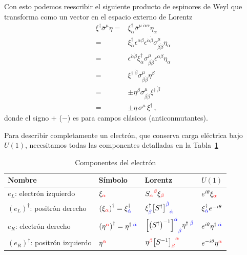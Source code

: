 Con esto podemos reescribir el siguiente producto de espinores  de Weyl que transforma como un vector en el espacio externo de Lorentz
\begin{align}
\label{eq:exxe}
  \xi^{\dagger}\overline{\sigma}^{\mu}\eta=& \xi^{\dagger}_{\dot{\alpha}}\overline{\sigma}^{\mu\;\dot{\alpha}\alpha}\eta_{\alpha}\nonumber\\
=&\xi^{\dagger}_{\dot{\alpha}}\epsilon^{\alpha\beta}\epsilon^{\dot{\alpha}\dot{\beta}}{\sigma}^{\mu}_{\beta\dot{\beta}} \eta_{\alpha}\nonumber\\
  =&\epsilon^{\dot{\alpha}\dot{\beta}}\xi^{\dagger}_{\dot{\alpha}}{\sigma}^{\mu}_{\beta\dot{\beta}} \epsilon^{\alpha\beta}\eta_{\alpha}\nonumber\\
  =&\xi^{\dagger\;\dot{\beta}}{\sigma}^{\mu}_{\beta\dot{\beta}} \eta^{\beta}\nonumber\\
  =&\pm\eta^{\beta}{\sigma}^{\mu}_{\beta\dot{\beta}}\xi^{\dagger\;\dot{\beta}} \nonumber\\
  =&\pm\eta\,{\sigma}^{\mu}\,\xi^{\dagger} \,,
\end{align}
donde el signo $+$ ($-$) es para campos clásicos (anticonmutantes).
\begin{frame}
Para describir completamente un electrón, que conserva carga eléctrica bajo $U(1)$, necesitamos todas las componentes detalladas en la Tabla~\ref{tab:electron}
\begin{table}
  \centering
  \begin{tabular}{llll}
    Nombre & Símbolo & Lorentz & $U(1)$\\\hline
    $e_L$: electrón {\color{red}izquierdo} & $\xi_{\color{red}\alpha}$ & ${S_{\color{red}\alpha}}^{\color{red}\beta}\xi_{\color{red}\beta}$ & $e^{i\theta}\xi_{\color{red}\alpha}$\\
   $\left( e_L \right)^{\dagger}$: positrón {\color{blue}derecho}   & $\left( \xi_{\color{red}\alpha} \right)^{\dagger}=\xi^{\dagger}_{\color{blue}\dot{\alpha}}$ & $\xi^{\dagger}_{\color{blue}\dot{\beta}}{\left[{S^{\dagger}}\right]^{\color{blue}\dot{\beta}}}_{\color{blue}\dot{\alpha}}$ & $\xi^{\dagger}_{\color{blue}\dot{\alpha}}e^{-i\theta}$\\
   $e_R$: electrón {\color{blue}derecho}   & $\left( \eta^{\color{red}\alpha} \right)^{\dagger}=\eta^{\dagger\;\color{blue}\dot{\alpha}}$ & ${\left[ \left( S^{\dagger} \right)^{-1} \right]^{\color{blue}\dot{\alpha}}}_{\color{blue}\dot{\beta}}\eta^{\dagger\;\color{blue}\dot{\beta}}$& $e^{i\theta}\eta^{\dagger\;\color{blue}\dot{\alpha}}$\\
   $\left( e_R \right)^{\dagger}$: positrón {\color{red}izquierdo}&$\eta^{\color{red}\alpha}$& $\eta^{\color{red}\beta}{\left[ S^{-1}  \right]_{\color{red}\beta}}^{\color{red}\alpha}$ & $e^{-i\theta}\eta^{\color{red}\alpha}$\\\hline
  \end{tabular}
  \caption{Componentes del electrón}
  \label{tab:electron}
\end{table}

\end{frame}
